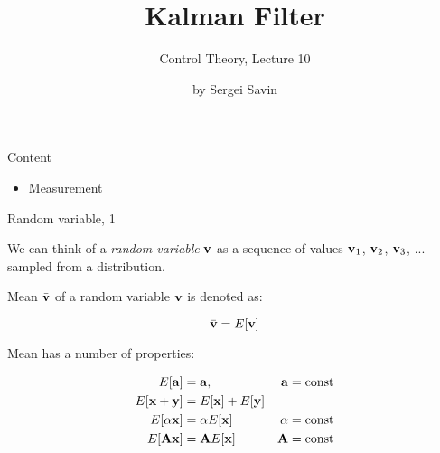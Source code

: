 \documentclass{beamer}
\title{Kalman Filter}
\subtitle{Control Theory, Lecture 10}
\author{by Sergei Savin}
\date{\mydate}
\begin{document}
\maketitle



\begin{frame}{Content}
\begin{itemize}
\item Measurement
\end{itemize}
\end{frame}




\begin{frame}{Random variable, 1}
\begin{flushleft}

We can think of a \emph{random variable} $\mathbf{v}$ as a sequence of values $\mathbf{v}_1$, $\mathbf{v}_2$, $\mathbf{v}_3$, ... - sampled from a distribution.

\bigskip

Mean $\bar{\mathbf{v}}$ of a random variable $\mathbf{v}$ is denoted as:

\begin{equation}
	\bar{\mathbf{v}} = E[\mathbf{v}]
\end{equation}

Mean has a number of properties:

\begin{align}
	E[\mathbf{a}] &= \mathbf{a}, & \mathbf{a}= \text{const} \\
	E[\mathbf{x}+\mathbf{y}] &= E[\mathbf{x}] + E[\mathbf{y}] &\\
	E[\alpha \mathbf{x}] &= \alpha  E[\mathbf{x}]  & \alpha = \text{const}\\
	E[\mathbf{A} \mathbf{x}] &= \mathbf{A}  E[\mathbf{x}] & \mathbf{A} = \text{const}
\end{align}


\end{flushleft}
\end{frame}
\end{document}
